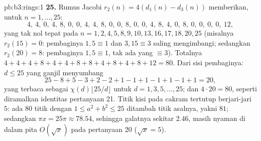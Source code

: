 \begin{solution}{pb:b3:rings:1}
\textbf{25.} Rumus Jacobi $r_2(n) = 4(d_1(n) - d_3(n))$
memberikan, untuk $n = 1, \dots, 25$:
\[
4,\ 4,\ 0,\ 4,\ 8,\ 0,\ 0,\ 4,\ 4,\ 8,\ 0,\ 0,\ 8,\ 0,\ 0,\
4,\ 8,\ 4,\ 0,\ 8,\ 0,\ 0,\ 0,\ 0,\ 12,
\]
yang tak nol tepat pada $n = 1, 2, 4, 5, 8, 9, 10, 13, 16, 17, 18,
20, 25$ (misalnya $r_2(15) = 0$: pembaginya $1, 5 \equiv 1$
dan $3, 15 \equiv 3$ saling mengimbangi; sedangkan $r_2(20) = 8$: pembaginya $1, 5
\equiv 1$, tak ada yang $\equiv 3$). Totalnya $4 + 4 + 4 + 8 + 4 +
4 + 8 + 8 + 4 + 8 + 4 + 8 + 12 = 80$. Dari sisi pembaginya:
$d \leq 25$ yang ganjil menyumbang
\[
25 - 8 + 5 - 3 + 2 - 2 + 1 - 1 + 1 - 1 + 1 - 1 + 1 = 20,
\]
yang terbaca sebagai $\chi(d)\lfloor 25/d\rfloor$ untuk $d = 1, 3, 5, \dots,
25$; dan $4 \cdot 20 = 80$, seperti diramalkan identitas pertanyaan 21.
Titik kisi pada cakram tertutup berjari-jari $5$: ada
$80$ titik dengan $1 \leq a^2 + b^2 \leq 25$ ditambah titik
asalnya, yakni $81$; sedangkan $\pi x = 25\pi \approx 78.54$, sehingga
galatnya sekitar $2.46$, masih nyaman di dalam pita $O(\sqrt x)$
pada pertanyaan 20 ($\sqrt x = 5$).

\end{solution}

